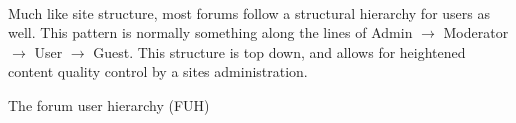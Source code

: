 \documentclass[]{article}
\begin{document}
\begin{minipage}{0.65\textwidth}
\paragraph{}
Much like site structure, most forums follow a structural hierarchy for users as well. This pattern is normally something along the lines of Admin $\to$ Moderator $\to$ User $\to$ Guest. This structure is top down, and allows for heightened content quality control by a sites administration.
\end{minipage}%
\hspace{0.5cm}
\vline
\hspace{0.5cm}
\begin{minipage}{0.35\textwidth}
\vspace{0.5 cm}
The forum user hierarchy (FUH)  
\end{minipage}%
\end{document}

